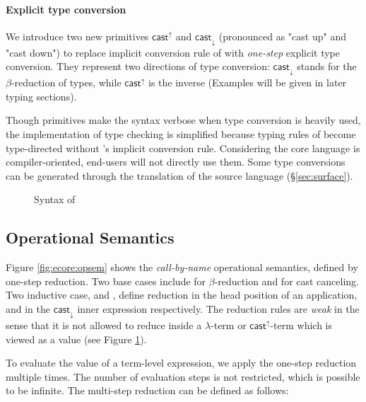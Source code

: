 \paragraph{Explicit type conversion}

We introduce two new primitives $ \mathsf{cast}^{\uparrow} $ and $ \mathsf{cast}_{\downarrow} $
(pronounced as "cast up" and "cast down") to replace implicit
conversion rule of \cc with \emph{one-step} explicit type
conversion. They represent two directions of type conversion:
$ \mathsf{cast}_{\downarrow} $ stands for the $\beta$-reduction of types, while
$ \mathsf{cast}^{\uparrow} $ is the inverse (Examples will be given in later typing sections).

Though \cast primitives make the syntax verbose when type conversion
is heavily used, the implementation of type checking is simplified
because typing rules of \ecore become type-directed without \cc's
implicit conversion rule. Considering the core language is
compiler-oriented, end-users will not directly use them. Some type
conversions can be generated through the translation of the source
language (\S \ref{sec:surface}).

\begin{figure}
    \gram{\ottec\ottinterrule
        \ottG\ottinterrule
        \ottv}
    \caption{Syntax of \ecore}
    \label{fig:ecore:syntax}
\end{figure}

\subsection{Operational Semantics}\label{sec:ecore:opsem}

Figure \ref{fig:ecore:opsem} shows the \emph{call-by-name} operational
semantics, defined by one-step reduction. Two base cases include
 for $\beta$-reduction and 
for cast canceling. Two inductive case,  and
, define reduction in the head position of an
application, and in the $ \mathsf{cast}_{\downarrow} $ inner expression
respectively. The reduction rules are \emph{weak} in the sense that it
is not allowed to reduce inside a $\lambda$-term or $ \mathsf{cast}^{\uparrow} $-term
which is viewed as a value (see Figure \ref{fig:ecore:syntax}).

To evaluate the value of a term-level expression, we apply the
one-step reduction multiple times. The number of evaluation steps is
not restricted, which is possible to be infinite. The multi-step
reduction can be defined as follows:

